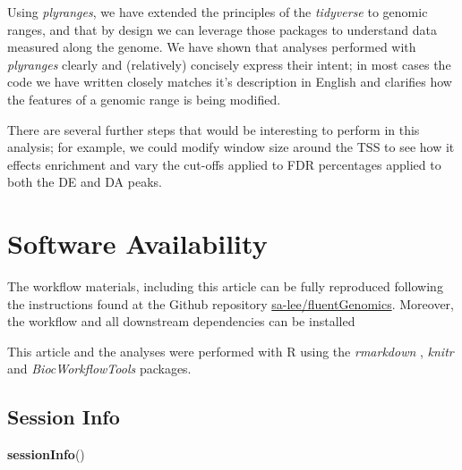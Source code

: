 \documentclass[
  9pt,
  a4paper,
]{extarticle}
\newenvironment{Shaded}{\begin{snugshade}}{\end{snugshade}}
\newcommand{\KeywordTok}[1]{\textcolor[rgb]{0.13,0.29,0.53}{\textbf{#1}}}
\newcommand{\NormalTok}[1]{#1}
\begin{document}
Using \emph{plyranges}, we have extended the principles of the \emph{tidyverse} to
genomic ranges, and that by design we can leverage those packages to understand
data measured along the genome. We have shown that analyses performed with
\emph{plyranges} clearly and (relatively) concisely express their intent; in most
cases the code we have written closely matches it's description in English and
clarifies how the features of a genomic range is being modified.

There are several further steps that would be interesting to perform in this
analysis; for example, we could modify window size around the TSS to see how it
effects enrichment and vary the cut-offs applied to FDR percentages applied to
both the DE and DA peaks.

\hypertarget{software-availability}{%
\section{Software Availability}\label{software-availability}}

The workflow materials, including this article can be fully reproduced
following the instructions found at the Github repository
\href{https://github.com/sa-lee/fluentGenomics}{sa-lee/fluentGenomics}. Moreover,
the workflow and all downstream dependencies can be installed

This article and the analyses were performed with R \citep{baser} using the
\emph{rmarkdown} \citep{rmarkdown}, \emph{knitr} \citep{knitr, xie2015} and \emph{BiocWorkflowTools}
\citep{bcworkflowtools} packages.

\hypertarget{session-info}{%
\subsection{Session Info}\label{session-info}}

\begin{Shaded}
\begin{Highlighting}[]
\KeywordTok{sessionInfo}\NormalTok{()}
\end{Highlighting}
\end{Shaded}
\end{document}
